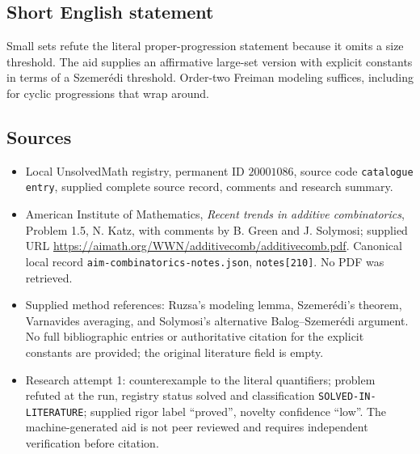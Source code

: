 \documentclass[11pt]{article}
\begin{document}
\subsection{Short English statement}
Small sets refute the literal proper-progression statement because it omits a size threshold. The aid supplies an affirmative large-set version with explicit constants in terms of a Szemer\'edi threshold. Order-two Freiman modeling suffices, including for cyclic progressions that wrap around.
\subsection{Sources}
\begin{itemize}
\item Local UnsolvedMath registry, permanent ID $20001086$, source code \texttt{catalogue entry}, supplied complete source record, comments and research summary.
\item American Institute of Mathematics, \emph{Recent trends in additive combinatorics}, Problem 1.5, N. Katz, with comments by B. Green and J. Solymosi; supplied URL \url{https://aimath.org/WWN/additivecomb/additivecomb.pdf}. Canonical local record \texttt{aim-combinatorics-notes.json}, \texttt{notes[210]}. No PDF was retrieved.
\item Supplied method references: Ruzsa's modeling lemma, Szemer\'edi's theorem, Varnavides averaging, and Solymosi's alternative Balog--Szemer\'edi argument. No full bibliographic entries or authoritative citation for the explicit constants are provided; the original literature field is empty.
\item Research attempt 1: counterexample to the literal quantifiers; problem refuted at the run, registry status solved and classification \texttt{SOLVED-IN-LITERATURE}; supplied rigor label ``proved'', novelty confidence ``low''. The machine-generated aid is not peer reviewed and requires independent verification before citation.
\end{itemize}
\end{document}
